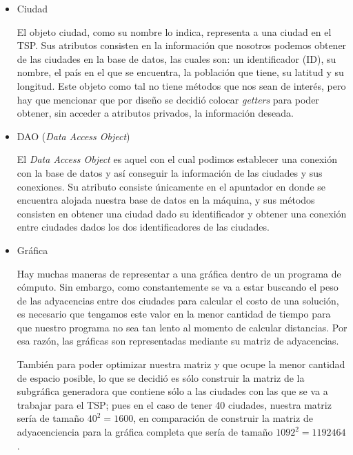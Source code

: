 \documentclass{article}
\newcommand{\tit}[1]{\textit{#1}}
\begin{document}
  \begin{itemize}
    \item Ciudad

      El objeto ciudad, como su nombre lo indica, representa a una ciudad
      en el TSP. Sus atributos consisten en la información que nosotros 
      podemos obtener de las ciudades en la base de datos, las cuales son:
      un identificador (ID), su nombre, el país en el que se encuentra, 
      la población que tiene, su latitud y su longitud. Este objeto 
      como tal no tiene métodos que nos sean de interés, pero hay que 
      mencionar que por diseño se decidió colocar \tit{getters} para 
      poder obtener, sin acceder a atributos privados, la información 
      deseada.

    \item DAO (\tit{Data Access Object})
      
      El \tit{Data Access Object} es aquel con el cual podimos establecer 
      una conexión con la base de datos y así conseguir la información de 
      las ciudades y sus conexiones. Su atributo consiste únicamente en el 
      apuntador en donde se encuentra alojada nuestra base de datos en la
      máquina, y sus métodos consisten en obtener una ciudad dado su 
      identificador y obtener una conexión entre ciudades dados los dos 
      identificadores de las ciudades.
      
    \item Gráfica
      
      Hay muchas maneras de representar a una gráfica dentro de un programa
      de cómputo. Sin embargo, como constantemente se va a estar buscando 
      el peso de las adyacencias entre dos ciudades para calcular el costo 
      de una solución, es necesario que tengamos este valor en la menor 
      cantidad de tiempo para que nuestro programa no sea tan lento 
      al momento de calcular distancias. Por esa razón, las gráficas 
      son representadas mediante su matriz de adyacencias.

      También para poder optimizar nuestra matriz y que ocupe la menor 
      cantidad de espacio posible, lo que se decidió es sólo construir la 
      matriz de la subgráfica generadora que contiene sólo a las ciudades 
      con las que se va a trabajar para el TSP; pues en el caso de 
      tener 40 ciudades, nuestra matriz sería de tamaño $40^2 = 1600$,
      en comparación de construir la matriz de adyacenciencia para la 
      gráfica completa que sería de tamaño $1092^2 = 1192464$.


\end{itemize}
\end{document}
